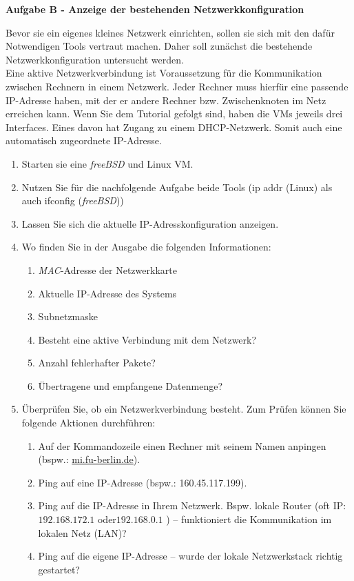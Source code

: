 \documentclass[paper=a4,fontsize=11pt]{scrartcl}%
\begin{document}
\begin{center}
\Large{\textbf{Aufgabe B - Anzeige der bestehenden Netzwerkkonfiguration}}
\end{center}
Bevor sie ein eigenes kleines Netzwerk einrichten, sollen sie sich mit den dafür Notwendigen Tools vertraut machen. Daher soll zunächst die bestehende Netzwerkkonfiguration untersucht werden.\\
Eine aktive Netzwerkverbindung ist Voraussetzung für die Kommunikation zwischen Rechnern in einem Netzwerk. Jeder Rechner muss hierfür eine passende IP-Adresse haben, mit der er andere Rechner bzw. Zwischenknoten im Netz erreichen kann. Wenn Sie dem Tutorial gefolgt sind, haben die VMs jeweils drei Interfaces. Eines davon hat Zugang zu einem DHCP-Netzwerk. Somit auch eine automatisch zugeordnete IP-Adresse.
\begin{enumerate}
	\item Starten sie eine \emph{freeBSD} und Linux VM. 
	\item Nutzen Sie für die nachfolgende Aufgabe beide Tools (ip addr (Linux) als auch ifconfig (\emph{freeBSD}))
	\item Lassen Sie sich die aktuelle IP-Adresskonfiguration anzeigen.
	\item Wo finden Sie in der Ausgabe die folgenden Informationen:
	\begin{enumerate}
		\item \emph{MAC}-Adresse der Netzwerkkarte
		\item Aktuelle IP-Adresse des Systems
		\item Subnetzmaske
		\item Besteht eine aktive Verbindung mit dem Netzwerk?
		\item Anzahl fehlerhafter Pakete?
		\item Übertragene und empfangene Datenmenge?
	\end{enumerate}
	\item Überprüfen Sie, ob ein Netzwerkverbindung besteht. Zum Prüfen können Sie folgende Aktionen durchführen:
	\begin{enumerate}
		\item Auf der Kommandozeile einen Rechner mit seinem Namen anpingen (bspw.: \url{mi.fu-berlin.de}).
		\item Ping auf eine IP-Adresse (bspw.: 160.45.117.199).
		\item Ping auf die IP-Adresse in Ihrem Netzwerk. Bspw. lokale Router (oft IP: $192.168.172.1$ oder$192.168.0.1$ ) -- funktioniert die Kommunikation im lokalen Netz (LAN)?
		\item Ping auf die eigene IP-Adresse -- wurde der lokale Netzwerkstack richtig gestartet?
	\end{enumerate}
\end{enumerate}
\end{document}

